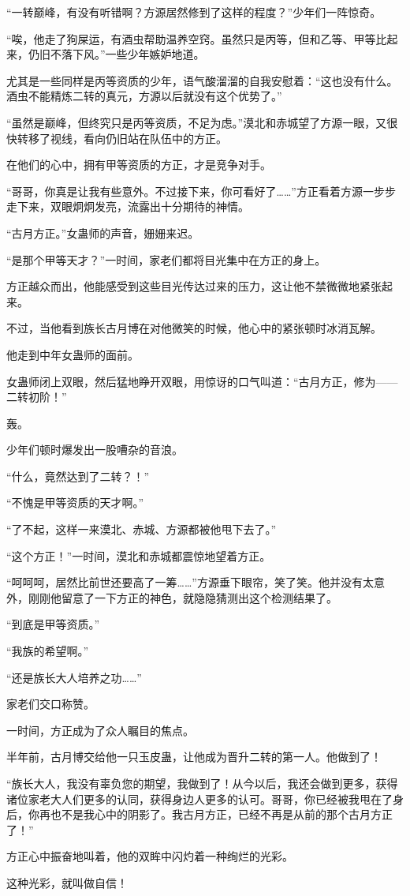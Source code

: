 \begin{this_body}
“一转巅峰，有没有听错啊？方源居然修到了这样的程度？”少年们一阵惊奇。

“唉，他走了狗屎运，有酒虫帮助温养空窍。虽然只是丙等，但和乙等、甲等比起来，仍旧不落下风。”一些少年嫉妒地道。

尤其是一些同样是丙等资质的少年，语气酸溜溜的自我安慰着：“这也没有什么。酒虫不能精炼二转的真元，方源以后就没有这个优势了。”

“虽然是巅峰，但终究只是丙等资质，不足为虑。”漠北和赤城望了方源一眼，又很快转移了视线，看向仍旧站在队伍中的方正。

在他们的心中，拥有甲等资质的方正，才是竞争对手。

“哥哥，你真是让我有些意外。不过接下来，你可看好了……”方正看着方源一步步走下来，双眼炯炯发亮，流露出十分期待的神情。

“古月方正。”女蛊师的声音，姗姗来迟。

“是那个甲等天才？”一时间，家老们都将目光集中在方正的身上。

方正越众而出，他能感受到这些目光传达过来的压力，这让他不禁微微地紧张起来。

不过，当他看到族长古月博在对他微笑的时候，他心中的紧张顿时冰消瓦解。

他走到中年女蛊师的面前。

女蛊师闭上双眼，然后猛地睁开双眼，用惊讶的口气叫道：“古月方正，修为——二转初阶！”

轰。

少年们顿时爆发出一股嘈杂的音浪。

“什么，竟然达到了二转？！”

“不愧是甲等资质的天才啊。”

“了不起，这样一来漠北、赤城、方源都被他甩下去了。”

“这个方正！”一时间，漠北和赤城都震惊地望着方正。

“呵呵呵，居然比前世还要高了一筹……”方源垂下眼帘，笑了笑。他并没有太意外，刚刚他留意了一下方正的神色，就隐隐猜测出这个检测结果了。

“到底是甲等资质。”

“我族的希望啊。”

“还是族长大人培养之功……”

家老们交口称赞。

一时间，方正成为了众人瞩目的焦点。

半年前，古月博交给他一只玉皮蛊，让他成为晋升二转的第一人。他做到了！

“族长大人，我没有辜负您的期望，我做到了！从今以后，我还会做到更多，获得诸位家老大人们更多的认同，获得身边人更多的认可。哥哥，你已经被我甩在了身后，你再也不是我心中的阴影了。我古月方正，已经不再是从前的那个古月方正了！”

方正心中振奋地叫着，他的双眸中闪灼着一种绚烂的光彩。

这种光彩，就叫做自信！

\end{this_body}

